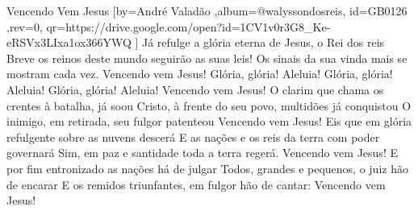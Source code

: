 \beginsong
{Vencendo Vem Jesus %
}[by={André Valadão %
},album={@walyssondosreis},
id={GB0126 %
},rev={0}, %
qr={https://drive.google.com/open?id=1CV1v0r3G8_Ke-eRSVx3LIxa1ox366YWQ %
}]
\beginverse*
Já refulge a glória eterna de Jesus, o Rei dos reis
Breve os reinos deste mundo seguirão as suas leis!
Os sinais da sua vinda mais se mostram cada vez.
Vencendo vem Jesus!
\endverse
\beginchorus
Glória, glória! Aleluia!
Glória, glória! Aleluia!
Glória, glória! Aleluia!
Vencendo vem Jesus!
\endchorus
\beginverse*
O clarim que chama os crentes à batalha, já soou
Cristo, à frente do seu povo, multidões já conquistou
O inimigo, em retirada, seu fulgor patenteou
Vencendo vem Jesus!
\endverse
\beginverse*
Eis que em glória refulgente sobre as nuvens descerá
E as nações e os reis da terra com poder governará
Sim, em paz e santidade toda a terra regerá.
Vencendo vem Jesus!
\endverse
\beginverse*
E por fim entronizado as nações há de julgar
Todos, grandes e pequenos, o juiz hão de encarar
E os remidos triunfantes, em fulgor hão de cantar:
Vencendo vem Jesus!
\endverse

